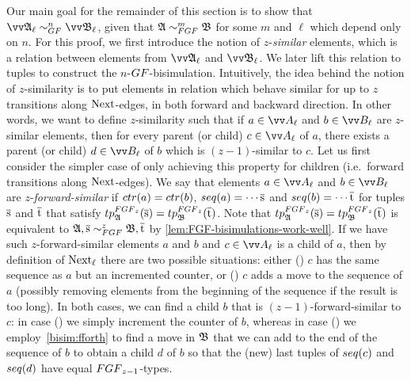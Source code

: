 Our main goal for the remainder of this section is to show that $\unravel{A}_{\ell} \bisimto_{\GF}^{n} \unravel{B}_{\ell}$, given that $\str{A} \bisimto_{\FGF}^{m} \str{B}$ for some $m$ and $\ell$ which depend only on $n$.
For this proof, we first introduce the notion of $z$-\emph{similar} elements, which is a relation between elements from $\unravel{A}_{\ell}$ and $\unravel{B}_{\ell}$.
We later lift this relation to tuples to construct the $n$-$\GF$-bisimulation.
Intuitively, the idea behind the notion of $z$-similarity is to put elements in relation which behave similar for up to $z$ transitions along $\mathrm{Next}$-edges, in both forward and backward direction.
In other words, we want to define $z$-similarity such that if $a \in \unraveldom{A}_{\ell}$ and $b \in \unraveldom{B}_{\ell}$ are $z$-similar elements, then for every parent (or child) $c \in \unraveldom{A}_{\ell}$ of $a$, there exists a parent (or child) $d \in \unraveldom{B}_{\ell}$ of $b$ which is $(z-1)$-similar to $c$.
Let us first consider the simpler case of only achieving this property for children (i.e.\ forward transitions along $\mathrm{Next}$-edges).
We say that elements $a \in \unraveldom{A}_{\ell}$ and $b \in \unraveldom{B}_{\ell}$ are $z$-\emph{forward-similar} if $\ctr{a} = \ctr{b}$, $\seq{a} = \cdots \elemtuples$ and $\seq{b} = \cdots \elemtuplet$ for tuples $\overline{\mathrm{s}}$ and $\overline{\mathrm{t}}$ that satisfy $\tp{\FGF_{z}}{\str{A}}{\elemtuples} = \tp{\FGF_{z}}{\str{B}}{\elemtuplet}$.
Note that $\tp{\FGF_{z}}{\str{A}}{\elemtuples} = \tp{\FGF_{z}}{\str{B}}{\elemtuplet}$ is equivalent to $\str{A}, \elemtuples \bisimto_{\FGF}^{z} \str{B}, \elemtuplet$ by \cref{lem:FGF-bisimulations-work-well}.
If we have such $z$-forward-similar elements $a$ and $b$ and $c \in \unraveldom{A}_{\ell}$ is a child of $a$, then by definition of $\mathrm{Next}_{\ell}$ there are two possible situations: either () $c$ has the same sequence as $a$ but an incremented counter, or () $c$ adds a move to the sequence of $a$ (possibly removing elements from the beginning of the sequence if the result is too long).
In both cases, we can find a child $b$ that is $(z-1)$-forward-similar to $c$: in case () we simply increment the counter of $b$, whereas in case () we employ~\ref{bisim:fforth} to find a move in ${\mathfrak{B}}$ that we can add to the end of the sequence of $b$ to obtain a child $d$ of $b$ so that the (new) last tuples of $\seq{c}$ and $\seq{d}$ have equal $\FGF_{z-1}$-types.

